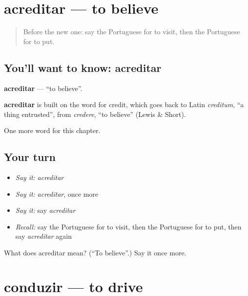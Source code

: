 \section[acreditar]{acreditar — to believe}

\label{lesson:PT-C131-acreditar}



\begin{quote}
Before the new one: say the Portuguese for to visit, then the Portuguese for to put.
\end{quote}

\subsection*{You'll want to know: acreditar}
\textbf{acreditar} — \textquotedblleft{}to believe\textquotedblright{}.

\begin{cousinweb}
\textbf{acreditar} is built on the word for credit, which goes back to Latin \emph{creditum}, \textquotedblleft{}a thing entrusted\textquotedblright{}, from \emph{credere}, \textquotedblleft{}to believe\textquotedblright{} (Lewis \& Short).
\end{cousinweb}

\begin{grammarlens}[title={What you've built}]
One more word for this chapter.
\end{grammarlens}

\subsection*{Your turn}
\begin{itemize}
\raggedright
  \item \emph{Say it:} \emph{acreditar}
  \item \emph{Say it:} \emph{acreditar}, once more
  \item \emph{Say it:} say \emph{acreditar}
  \item \emph{Recall:} say the Portuguese for to visit, then the Portuguese for to put, then say \emph{acreditar} again
\end{itemize}

\begin{tcolorbox}[breakable,colback=teal!4,colframe=teal!35!black,title={Before you move on}]
What does acreditar mean? (\textquotedblleft{}To believe\textquotedblright{}.) Say it once more.
\end{tcolorbox}
\section[conduzir]{conduzir — to drive}

